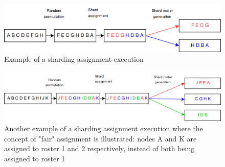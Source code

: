 \begin{figure}
	\centering
	\includegraphics[width=\textwidth]{sharding1.png}
	\caption{\label{fig:sharding1} Example of a sharding assignment execution}
\end{figure}

\begin{figure}
	\centering
	\includegraphics[width=\textwidth]{sharding2.png}
	\caption{\label{fig:sharding2} Another example of a sharding assignment execution where the concept of "fair" assignment is illustrated: nodes A and K are assigned to roster 1 and 2 respectively, instead of both being assigned to roster 1}
\end{figure}


